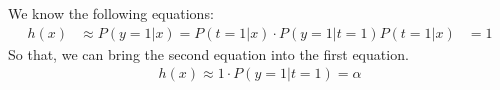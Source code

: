 \begin{answer}
We know the following equations:
\begin{align}
    h(x) &\approx P(y=1|x) = P(t=1|x) \cdot P(y=1|t=1)
    P(t=1|x) &= 1
\end{align}
So that, we can bring the second equation into the first equation.
\begin{align*}
    h(x) \approx 1 \cdot P(y=1|t=1) = \alpha
\end{align*}
\end{answer}
